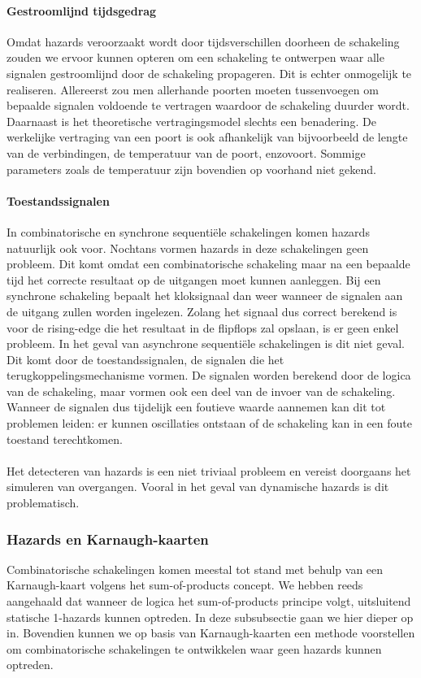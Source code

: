 \paragraph{Gestroomlijnd tijdsgedrag}
Omdat hazards veroorzaakt wordt door tijdsverschillen doorheen de schakeling zouden we ervoor kunnen opteren om een schakeling te ontwerpen waar alle signalen gestroomlijnd door de schakeling propageren. Dit is echter onmogelijk te realiseren. Allereerst zou men allerhande poorten moeten tussenvoegen om bepaalde signalen voldoende te vertragen waardoor de schakeling duurder wordt. Daarnaast is het theoretische vertragingsmodel slechts een benadering. De werkelijke vertraging van een poort is ook afhankelijk van bijvoorbeeld de lengte van de verbindingen, de temperatuur van de poort, enzovoort. Sommige parameters zoals de temperatuur zijn bovendien op voorhand niet gekend.
\paragraph{Toestandssignalen}
In combinatorische en synchrone sequenti\"ele schakelingen komen hazards natuurlijk ook voor. Nochtans vormen hazards in deze schakelingen geen probleem. Dit komt omdat een combinatorische schakeling maar na een bepaalde tijd het correcte resultaat op de uitgangen moet kunnen aanleggen. Bij een synchrone schakeling bepaalt het kloksignaal dan weer wanneer de signalen aan de uitgang zullen worden ingelezen. Zolang het signaal dus correct berekend is voor de rising-edge die het resultaat in de flipflops zal opslaan, is er geen enkel probleem. In het geval van asynchrone sequenti\"ele schakelingen is dit niet geval. Dit komt door de toestandssignalen, de signalen die het terugkoppelingsmechanisme vormen. De signalen worden berekend door de logica van de schakeling, maar vormen ook een deel van de invoer van de schakeling. Wanneer de signalen dus tijdelijk een foutieve waarde aannemen kan dit tot problemen leiden: er kunnen oscillaties ontstaan of de schakeling kan in een foute toestand terechtkomen.
\paragraph{}
Het detecteren van hazards is een niet triviaal probleem en vereist doorgaans het simuleren van overgangen. Vooral in het geval van dynamische hazards is dit problematisch.
\subsubsection{Hazards en Karnaugh-kaarten}
Combinatorische schakelingen komen meestal tot stand met behulp van een Karnaugh-kaart volgens het sum-of-products concept. We hebben reeds aangehaald dat wanneer de logica het sum-of-products principe volgt, uitsluitend statische 1-hazards kunnen optreden. In deze subsubsectie gaan we hier dieper op in. Bovendien kunnen we op basis van Karnaugh-kaarten een methode voorstellen om combinatorische schakelingen te ontwikkelen waar geen hazards kunnen optreden.
